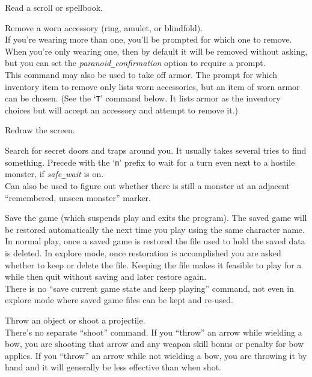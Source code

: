 \item[\tb{r}]
Read a scroll or spellbook.
\item[\tb{R}]
Remove a worn accessory (ring, amulet, or blindfold).\\
If you're wearing more than one, you'll be prompted for which one to
remove.  When you're only wearing one, then by default it will be removed
without asking, but you can set the
{\it paranoid\verb+_+confirmation\/}
option to require a prompt.\\
This command may also be used to take off armor.  The prompt for which
inventory item to remove only lists worn accessories, but an item of
worn armor can be chosen.
(See the `{\tt T}' command below.  It lists armor as the inventory
choices but will accept an accessory and attempt to remove it.)
\item[\tb{\^{}R}]
Redraw the screen.
\item[\tb{s}]
Search for secret doors and traps around you.
It usually takes several tries to find something.
Precede with the `{\tt m}' prefix to wait for a turn
even next to a hostile monster, if {\it safe\verb+_+wait\/}
is on.\\
Can also be used to figure out whether there is still a monster at
an adjacent ``remembered, unseen monster'' marker.
\item[\tb{S}]
Save the game (which suspends play and exits the program).
The saved game will be restored automatically the next time you play
using the same character name.\\
In normal play, once a saved game is restored the file used to hold
the saved data is deleted.
In explore mode, once restoration is accomplished you are asked whether
to keep or delete the file.
Keeping the file makes it feasible to play for a while then quit
without saving and later restore again.\\
There is no ``save current game state and keep playing'' command, not
even in explore mode where saved game files can be kept and re-used.
\item[\tb{t}]
Throw an object or shoot a projectile.\\
There's no separate ``shoot'' command.
If you ``throw'' an arrow while wielding a bow, you are shooting
that arrow and any weapon skill bonus or penalty for bow applies.
If you ``throw'' an arrow while not wielding a bow, you are throwing
it by hand and it will generally be less effective than when shot.\\
